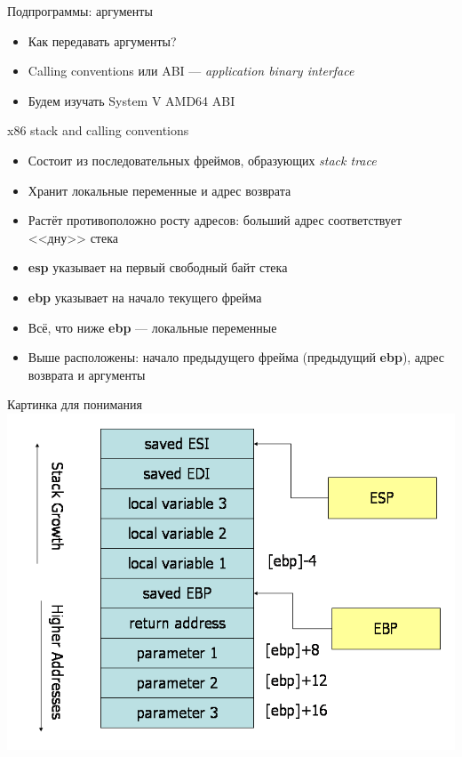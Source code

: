 \documentclass[10pt,pdf,hyperref={unicode}]{beamer}
\begin{document}
\begin{frame}{Подпрограммы: аргументы}
    \begin{itemize}
        \item Как передавать аргументы?
        \item Calling conventions или ABI — \emph{application binary interface}
        \item Будем изучать System V AMD64 ABI
    \end{itemize}
\end{frame}

\begin{frame}{x86 stack and calling conventions}
\begin{itemize}
    \item Состоит из последовательных фреймов, образующих \emph{stack trace}
    \item Хранит локальные переменные и адрес возврата
    \item Растёт противоположно росту адресов: больший адрес соответствует <<дну>> стека
    \item \textbf{esp} указывает на первый свободный байт стека
    \item \textbf{ebp} указывает на начало текущего фрейма
    \item Всё, что ниже \textbf{ebp} — локальные переменные
    \item Выше расположены: начало предыдущего фрейма (предыдущий \textbf{ebp}),  адрес возврата и аргументы
\end{itemize}
\end{frame}

\begin{frame}{Картинка для понимания}
\center\includegraphics[scale=0.3]{stack.png}
\end{frame}
\end{document}
